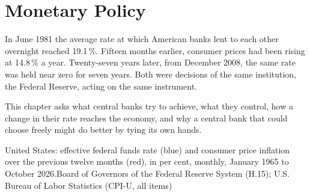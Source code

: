 \chapter{Monetary Policy}\label{ch:g12:monetary-policy}

In June 1981 the average rate at which American banks lent to each other overnight reached 19.1\,\%. Fifteen months earlier, consumer prices had been rising at 14.8\,\% a
year. Twenty-seven years later, from December 2008, the same rate was held near zero for seven years. Both were decisions of the same institution, the Federal Reserve,
acting on the same instrument.

This chapter asks what central banks try to achieve, what they control, how a change in their rate reaches the economy, and why a central bank that could choose freely
might do better by tying its own hands.

\begin{openingchart}{United States: effective federal funds rate (blue) and consumer price inflation over the previous twelve months (red), in per cent, monthly, January
1965 to October 2026.}{Board of Governors of the Federal Reserve System (H.15); U.S. Bureau of Labor Statistics (CPI-U, all items)}
\end{openingchart}

